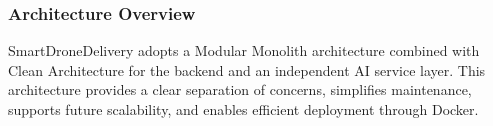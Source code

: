 \subsubsection{Architecture Overview}

SmartDroneDelivery adopts a Modular Monolith architecture combined with Clean Architecture for the backend and an independent AI service layer. This architecture provides a clear separation of concerns, simplifies maintenance, supports future scalability, and enables efficient deployment through Docker.

